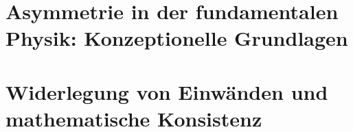 \documentclass[11pt,oneside]{book}
\begin{document}
\tableofcontents

\mainmatter
\pagestyle{plain}

\chapter{Asymmetrie in der fundamentalen Physik: Konzeptionelle Grundlagen}


\chapter{Widerlegung von Einwänden und mathematische Konsistenz}

\end{document}
